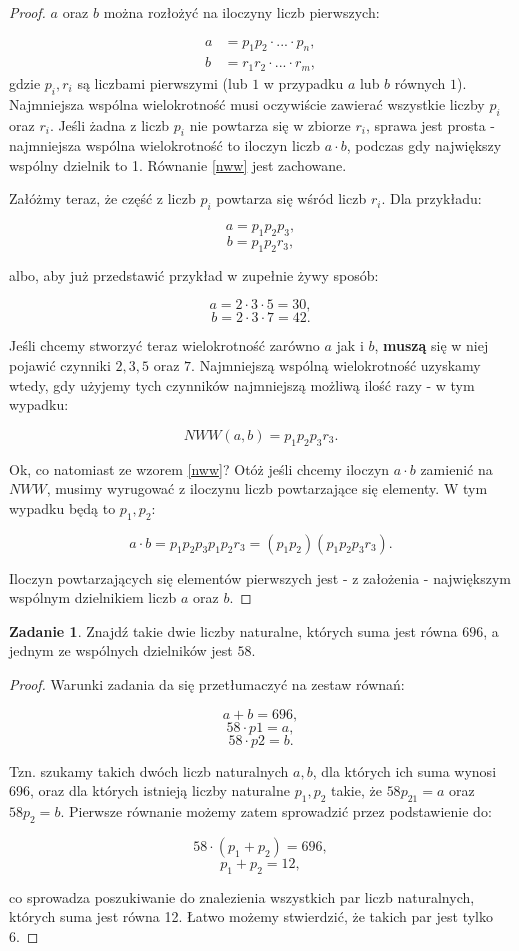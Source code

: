 \documentclass[11pt]{article}
\theoremstyle{definition}
\newtheorem{zad}{Zadanie}
\begin{document}
\begin{proof}
$a$ oraz $b$ można rozłożyć na iloczyny liczb pierwszych:

\begin{align*}
a &= p_1p_2\cdot...\cdot p_n,\\
b &= r_1r_2\cdot...\cdot r_m,
\end{align*}
gdzie $p_i, r_i$ są liczbami pierwszymi (lub $1$ w przypadku $a$ lub $b$ równych $1$). Najmniejsza wspólna wielokrotność musi oczywiście zawierać wszystkie liczby $p_i$ oraz $r_i$. Jeśli żadna z liczb $p_i$ nie powtarza się w zbiorze $r_i$, sprawa jest prosta - najmniejsza wspólna wielokrotność to iloczyn liczb $a\cdot b$, podczas gdy największy wspólny dzielnik to 1. Równanie \ref{nww} jest zachowane. 

Załóżmy teraz, że część z liczb $p_i$ powtarza się wśród liczb $r_i$. Dla przykładu:

$$a = p_1p_2p_3,$$
$$b = p_1p_2r_3,$$

albo, aby już przedstawić przykład w zupełnie żywy sposób:

$$a = 2\cdot 3\cdot 5 = 30,$$
$$b = 2\cdot 3\cdot 7 = 42.$$

Jeśli chcemy stworzyć teraz wielokrotność zarówno $a$ jak i $b$, \textbf{muszą} się w niej pojawić czynniki $2, 3, 5$ oraz $7$. Najmniejszą wspólną wielokrotność uzyskamy wtedy, gdy użyjemy tych czynników najmniejszą możliwą ilość razy - w tym wypadku:

$$NWW(a,b) = p_1p_2p_3 r_3.$$

Ok, co natomiast ze wzorem \ref{nww}? Otóż jeśli chcemy iloczyn $a\cdot b$ zamienić na $NWW$, musimy wyrugować z iloczynu liczb powtarzające się elementy. W tym wypadku będą to $p_1, p_2$:

$$a\cdot b = p_1p_2p_3p_1p_2r_3 = (p_1p_2)(p_1p_2p_3r_3).$$

Iloczyn powtarzających się elementów pierwszych jest - z założenia - największym wspólnym dzielnikiem liczb $a$ oraz $b$.

\end{proof}

\begin{zad}
Znajdź takie dwie liczby naturalne, których suma jest równa $696$, a jednym ze wspólnych dzielników jest $58$.
\end{zad}

\begin{proof}
Warunki zadania da się przetłumaczyć na zestaw równań:

$$a+b = 696,$$
$$58\cdot p1 = a,$$
$$58\cdot p2 = b.$$

Tzn. szukamy takich dwóch liczb naturalnych $a,b$, dla których ich suma wynosi 696, oraz dla których istnieją liczby naturalne $p_1,p_2$ takie, że $58p_21 = a$ oraz $58p_2 = b$. Pierwsze równanie możemy zatem sprowadzić przez podstawienie do:

$$58\cdot(p_1+p_2) = 696,$$
$$p_1+p_2 = 12,$$

co sprowadza poszukiwanie do znalezienia wszystkich par liczb naturalnych, których suma jest równa 12. Łatwo możemy stwierdzić, że takich par jest tylko 6.
\end{proof}
\end{document}
